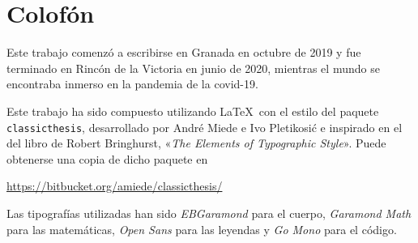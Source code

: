 \pagestyle{empty}

\hfill

\vfill


\section*{Colofón}
Este trabajo comenzó a escribirse en Granada en octubre de 2019 y fue terminado en Rincón de la Victoria en junio de 2020, mientras el mundo se encontraba inmerso en la pandemia de la covid-19.

Este trabajo ha sido compuesto utilizando \LaTeX\ con el estilo del paquete \texttt{classicthesis}, desarrollado por André Miede e Ivo Pletikosić e inspirado en el del libro de Robert Bringhurst, «\emph{The Elements of Typographic Style}».
Puede obtenerse una copia de dicho paquete en
\begin{center}
\url{https://bitbucket.org/amiede/classicthesis/}
\end{center}
Las tipografías utilizadas han sido \emph{EBGaramond} para el cuerpo, \emph{Garamond Math} para las matemáticas, \emph{Open Sans} para las leyendas y \emph{Go Mono} para el código.
\bigskip